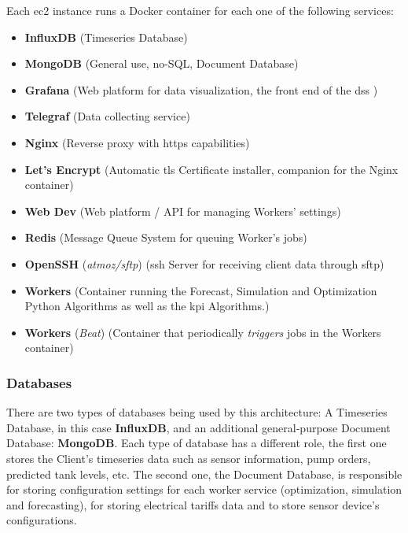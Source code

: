 Each \gls{ec2} instance runs a Docker container for each one of the following services:

\begin{itemize}

\item \textbf{InfluxDB} (Timeseries Database)
\item \textbf{MongoDB} (General use, no-SQL, Document Database)
\item \textbf{Grafana} (Web platform for data visualization, the front end of the \gls{dss} \parencite{grafana})
\item \textbf{Telegraf} (Data collecting service)
\item \textbf{Nginx} (Reverse proxy with \gls{https} capabilities)
\item \textbf{Let's Encrypt} (Automatic \gls{tls} Certificate installer, companion for the Nginx container)
\item \textbf{Web Dev} (Web platform / API for managing Workers' settings)
\item \textbf{Redis} (Message Queue System for queuing Worker's jobs)
\item \textbf{OpenSSH} (\textit{atmoz/sftp}) (\gls{ssh} Server for receiving client data through \gls{sftp})
\item \textbf{Workers} (Container running the Forecast, Simulation and Optimization Python Algorithms as well as the \gls{kpi} Algorithms.)
\item \textbf{Workers} (\textit{Beat}) (Container that periodically \textit{triggers} jobs in the Workers container)

\end{itemize}





\subsubsection{Databases}\label{methodology:sss:databases}

There are two types of databases being used by this architecture: A Timeseries Database, in this case \textbf{InfluxDB}, and an additional general-purpose Document Database: \textbf{MongoDB}. Each type of database has a different role, the first one stores the Client's timeseries data such as sensor information, pump orders, predicted tank levels, etc.
The second one, the Document Database, is responsible for storing configuration settings for each worker service (optimization, simulation and forecasting), for storing electrical tariffs data and to store sensor device's configurations.

